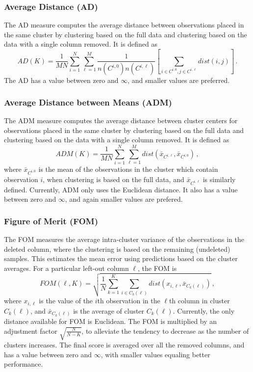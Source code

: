 \documentclass[11pt]{article}
\begin{document}
\subsubsection*{Average Distance (AD)}

The AD measure computes the average distance between observations placed
in the same cluster by clustering based on the full data and clustering based
on the data with a single column removed.  
It is defined as 
$$
AD(K) = \frac{1}{MN}\sum\limits_{i=1}^N\sum\limits_{\ell=1}^M
\frac{1}{n(C^{i,0})n(C^{i,\ell})}\left[ \sum\limits_{i\in C^{i,0}, j
  \in C^{i,\ell}} dist(i,j)\right] \,.
$$
The AD has a value between zero and $\infty$, and smaller values are preferred.

\subsubsection*{Average Distance between Means (ADM)}
The ADM measure computes  the average
distance between cluster centers for observations placed in the same cluster
by clustering based on the full data and clustering based
on the data with a single column removed.  
It is defined as 
$$
ADM(K) =  \frac{1}{MN}\sum\limits_{i=1}^N\sum\limits_{\ell=1}^M
dist(\bar{x}_{C^{i,\ell}}, \bar{x}_{C^{i,0}})\,,
$$
where $\bar{x}_{C^{i,0}}$ is the mean of the observations in the
cluster which contain observation $i$, when clustering is based on the
full data, and $\bar{x}_{C^{i,\ell}}$ is similarly defined.
Currently, ADM only uses the Euclidean distance. %
It also has a value between zero and $\infty$, and again smaller
values are prefered.

\subsubsection*{Figure of Merit (FOM)}

The FOM measures the average intra-cluster variance
of the observations in the deleted column, where the clustering is based on the remaining
(undeleted) samples.  This estimates the mean error using
predictions based on the cluster averages.
For a particular left-out column $\ell$, the FOM is 
$$
FOM(\ell, K) =  \sqrt{\frac{1}{N}\sum\limits_{k=1}^K\sum\limits_{i\in
    C_k(\ell)} dist(x_{i,\ell}, \bar{x}_{C_k(\ell)})}\,,
$$
where $x_{i,\ell}$ is the value of the $i$th observation in the
$\ell$th column in
cluster $C_k(\ell)$, and $\bar{x}_{C_k(\ell)}$ is the average of
cluster ${C_k(\ell)}$.
Currently, the only distance available for FOM is Euclidean.
The FOM is multiplied by an adjustment factor $\sqrt{\frac{N}{N-K}}$,
to alleviate the tendency to decrease as the number of clusters
increases.  The final score is averaged over all the removed columns,
and has a value between zero and $\infty$, with smaller values
equaling better performance. 
\end{document}
